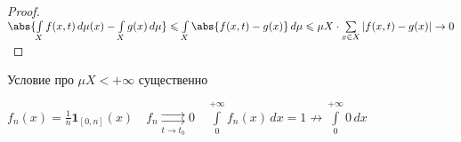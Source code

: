 \begin{proof}\thmslashn
	
	$\abs{\int\limits_{X} f(x, t) \,d\mu (x) - \int\limits_{X} g(x)\,d\mu} \leqslant \int\limits_{X} \abs{f(x, t) - g(x)}\,d\mu \leqslant \mu X \cdot \sum\limits_{x\in X} |f(x, t) - g(x)| \to 0$	
	
\end{proof}

\begin{remark}\thmslashn
	
	Условие про $\mu X < +\infty$ существенно
	
	$f_n(x) = \frac{1}{n} \mathbf{1}_{[0, n]}(x) \quad f_n \underset{t\to t_0}\rightrightarrows 0 \quad \int\limits_{0}^{+\infty} f_n(x) \,dx = 1 \not \to \int\limits_{0}^{+\infty} 0 \,dx$ 
	
\end{remark}
